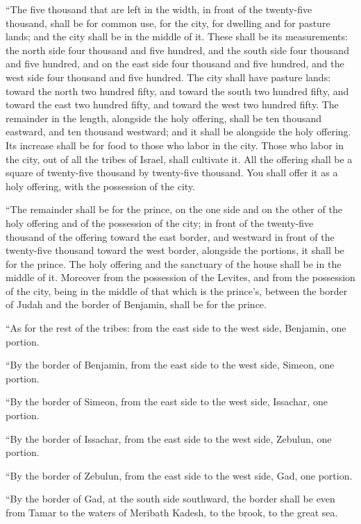 {\par }{\PP {}“The five thousand that are left in the width, in front of the twenty-five thousand, shall be for common use, for the city, for dwelling and for pasture lands; and the city shall be in the middle of it.
These shall be its measurements: the north side four thousand and five hundred, and the south side four thousand and five hundred, and on the east side four thousand and five hundred, and the west side four thousand and five hundred.
The city shall have pasture lands: toward the north two hundred fifty, and toward the south two hundred fifty, and toward the east two hundred fifty, and toward the west two hundred fifty.
The remainder in the length, alongside the holy offering, shall be ten thousand eastward, and ten thousand westward; and it shall be alongside the holy offering. Its increase shall be for food to those who labor in the city.
Those who labor in the city, out of all the tribes of Israel, shall cultivate it.
All the offering shall be a square of twenty-five thousand by twenty-five thousand. You shall offer it as a holy offering, with the possession of the city.
\par }{\PP {}“The remainder shall be for the prince, on the one side and on the other of the holy offering and of the possession of the city; in front of the twenty-five thousand of the offering toward the east border, and westward in front of the twenty-five thousand toward the west border, alongside the portions, it shall be for the prince. The holy offering and the sanctuary of the house shall be in the middle of it.
Moreover from the possession of the Levites, and from the possession of the city, being in the middle of that which is the prince’s, between the border of Judah and the border of Benjamin, shall be for the prince.
\par }{\PP {}“As for the rest of the tribes: from the east side to the west side, Benjamin, one portion.
\par }{\PP {}“By the border of Benjamin, from the east side to the west side, Simeon, one portion.
\par }{\PP {}“By the border of Simeon, from the east side to the west side, Issachar, one portion.
\par }{\PP {}“By the border of Issachar, from the east side to the west side, Zebulun, one portion.
\par }{\PP {}“By the border of Zebulun, from the east side to the west side, Gad, one portion.
\par }{\PP {}“By the border of Gad, at the south side southward, the border shall be even from Tamar to the waters of Meribath Kadesh, to the brook, to the great sea.
}
